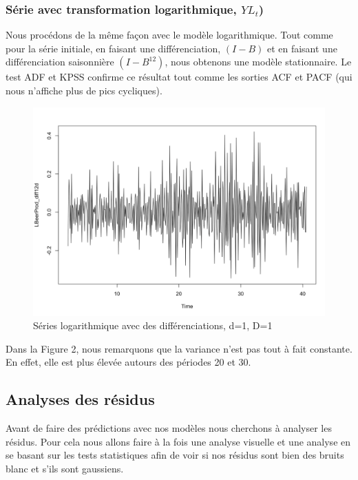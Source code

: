 \documentclass[12pt,a4paper]{book}
\newcommand{\1}{\mathds{1}}
\begin{document}
\vspace{5 mm}
\subsubsection{Série avec transformation logarithmique, $YL_t$)}

Nous procédons de la même façon avec le modèle logarithmique. Tout comme pour la série initiale, en faisant une différenciation, $(I-B)$ et en faisant une différenciation saisonnière $(I-B^{12})$, nous obtenons une modèle stationnaire. Le test ADF et KPSS confirme ce résultat tout comme les sorties ACF et PACF (qui nous n'affiche plus de pics cycliques). 

\begin{figure}[h]
 \centering
  \includegraphics[scale=0.3]{Log_Avecd1D1}  
\caption{Séries logarithmique avec des différenciations, d=1, D=1 }
\label{fig:1}
\end{figure}

Dans la Figure 2, nous remarquons que la variance n'est pas tout à fait constante. En effet, elle est plus élevée autours des périodes 20 et 30. 

\vspace{5 mm}
\subsection{Analyses des résidus}
Avant de faire des prédictions avec nos modèles nous cherchons à analyser les résidus. Pour cela nous allons faire à la fois une analyse visuelle et une analyse en se basant sur les tests statistiques afin de voir si nos résidus sont bien des bruits blanc et s'ils sont gaussiens.
\end{document}

